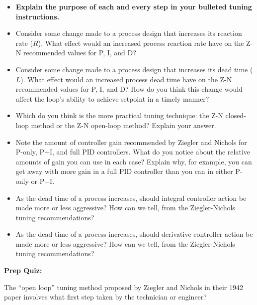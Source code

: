 \begin{itemize}
\item{} {\bf Explain the purpose of each and every step in your bulleted tuning instructions.}
\item{} Consider some change made to a process design that increases its reaction rate ($R$).  What effect would an increased process reaction rate have on the Z-N recommended values for P, I, and D?
\item{} Consider some change made to a process design that increases its dead time ($L$).  What effect would an increased process dead time have on the Z-N recommended values for P, I, and D?  How do you think this change would affect the loop's ability to achieve setpoint in a timely manner?
\item{} Which do you think is the more practical tuning technique: the Z-N closed-loop method or the Z-N open-loop method?  Explain your answer.
\item{} Note the amount of controller gain recommended by Ziegler and Nichols for P-only, P+I, and full PID controllers.  What do you notice about the relative amounts of gain you can use in each case?  Explain why, for example, you can get away with more gain in a full PID controller than you can in either P-only or P+I.
\item{} As the dead time of a process increases, should integral controller action be made more or less aggressive?  How can we tell, from the Ziegler-Nichols tuning recommendations?
\item{} As the dead time of a process increases, should derivative controller action be made more or less aggressive?  How can we tell, from the Ziegler-Nichols tuning recommendations?
\end{itemize}















\vfil \eject

\noindent
{\bf Prep Quiz:}

The ``open loop'' tuning method proposed by Ziegler and Nichols in their 1942 paper involves what first step taken by the technician or engineer?

